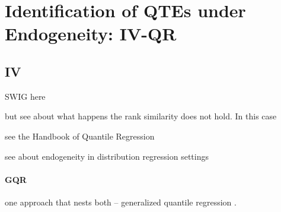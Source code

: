  
 \newpage 
 
 \section{Identification of QTEs under Endogeneity: IV-QR}
 \label{quantile:section:iv_qr}
 
 \subsection{IV}
 
 SWIG here
 
 but see \cite{Wuthrich2020ComparisonTwoQuantile} about what happens the rank similarity does not hold. 
 In this case 
 
 see the Handbook of Quantile Regression \cite{Koenker2017HandbookQuantileRegression}
 
 
 
 see \cite{Pereda-Fernandez2024EstimationCounterfactualDistributions} about endogeneity in distribution regression settings
 
 
 \paragraph{GQR}
 one approach that nests both -- generalized quantile regression \citep{Powell2020}. 
 
 
 
 